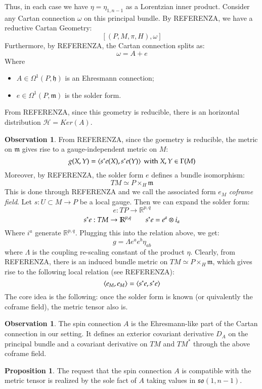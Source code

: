 \documentclass[12pt,a4paper]{report}
\theoremstyle{definition}
\theoremstyle{Theorem}
\newtheorem{Prop}[Def]{Proposition}
\theoremstyle{break}
\theoremstyle{definition}
\newtheorem{Obs}[Def]{Observation}
\begin{document}
	Thus, in each case we have $\eta=\eta_{1,n-1}$ as a Lorentzian inner product. Consider any Cartan connection $\omega$ on this principal bundle. By REFERENZA, we have a reductive Cartan Geometry:
		$$[(P,M,\pi,H),\omega]$$
	Furthermore, by REFERENZA, the Cartan connection splits as:
	$$\omega=A+e$$
	Where 
	\begin{itemize}
		\item $A\in\Omega^1(P,\mathfrak{h})$ is an Ehresmann connection;
		\item $e\in\Omega^1(P,\mathfrak{m})$ is the solder form.
	\end{itemize}
	From REFERENZA, since this geometry is reducible, there is an horizontal distribution $\mathcal{H}=Ker(A)$.\\
	\begin{Obs}
		From REFERENZA, since the goemetry is reducible, the metric on $\mathfrak{m}$ gives rise to a gauge-independent metric on $M$:
		$$g(X,Y)=\braket{s^*e(X),s^*e(Y)}\hbox{ with }X,Y\in\Gamma(M)$$
		Moreover, by REFERENZA, the solder form $e$ defines a bundle isomorphism:
		$$TM\simeq P\times_H \mathfrak{m}$$
		This is done through REFERENZA and we call the associated form $e_M$ \textit{coframe field}.
		Let $s:U\subset M\rightarrow P$ be a local gauge. Then we can expand the solder form:
		$$e:TP\rightarrow \mathbb{R}^{p,q}$$
		$$s^*e:TM\rightarrow \mathbb{R}^{p,q}\hspace{20 pt}s^*e=e^a\otimes i_a$$
		Where $i^a$ generate $\mathbb{R}^{p,q}$. Plugging this into the relation above, we get:
		$$g=\Lambda e^ae^b\eta_{ab}$$
		where $\Lambda$ is the coupling re-scaling constant of the product $\eta$. Clearly, from REFERENZA, there is an induced bundle metric on $TM\simeq P\times_H \mathfrak{m}$, which gives rise to the following local relation (see REFERENZA):
		$$\braket{e_M,e_M}=\braket{s^*e,s^*e}$$
		The core idea is the following: once the solder form is known (or quivalently the coframe field), the metric tensor also is.
	\end{Obs}
	\begin{Obs}
		The spin connection $A$ is the Ehresmann-like part of the Cartan connection in our setting. It defines an exterior covariant derivative $D_A$ on the principal bundle and a covariant derivative on $TM$ and $TM^*$ through the above coframe field. 
	\end{Obs}
	\begin{Prop}
		The request that the spin connection $A$ is compatible with the metric tensor is realized by the sole fact of $A$ taking values in $\mathfrak{so}(1,n-1)$.
	\end{Prop}
\end{document}
